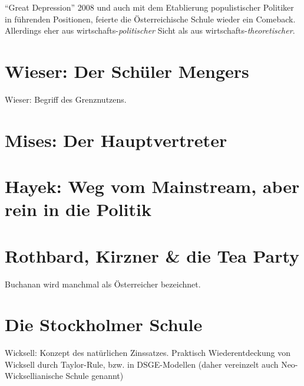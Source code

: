 "`Great Depression"' 2008 und auch mit dem Etablierung populistischer Politiker in  führenden Positionen, feierte die Österreichische Schule wieder ein Comeback. Allerdings eher aus wirtschafts-\textit{politischer} Sicht als aus wirtschafts-\textit{theoretischer}.

\section{Wieser: Der Schüler Mengers}
Wieser: Begriff des Grenznutzens. 

\section{Mises: Der Hauptvertreter}

\section{Hayek: Weg vom Mainstream, aber rein in die Politik}

\section{Rothbard, Kirzner \& die Tea Party}
Buchanan wird manchmal als Österreicher bezeichnet.


\section{Die Stockholmer Schule}
\label{cha:Stockholm}
Wicksell: Konzept des natürlichen Zinssatzes. Praktisch Wiederentdeckung von Wicksell durch Taylor-Rule, bzw. in DSGE-Modellen (daher vereinzelt auch Neo-Wicksellianische Schule genannt)
